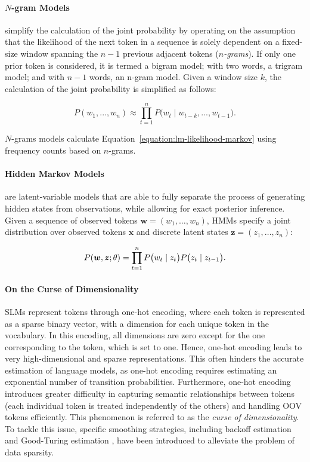 \paragraph{$N$-gram Models} simplify the calculation of the joint probability by operating on the assumption that the likelihood of the next token in a sequence is solely dependent on a fixed-size window spanning the $n-1$ previous adjacent tokens (\textit{$n$-grams}). If only one prior token is considered, it is termed a bigram model; with two words, a trigram model; and with $n-1$ words, an n-gram model. Given a window size $k$, the calculation of the joint probability is simplified as follows:

\begin{equation}
    P(w_1, ..., w_n) \approx \prod_{t=1}^{n} P\bigl(w_t \mid w_{t-k}, ..., w_{t-1}\bigr).
    \label{equation:lm-likelihood-markov}
\end{equation}

$N$-grams models calculate Equation~\ref{equation:lm-likelihood-markov} using frequency counts based on $n$-grams. 

\paragraph{Hidden Markov Models} are latent-variable models that are able to fully separate the process of generating hidden states from observations, while allowing for exact posterior inference. Given a sequence of observed tokens $\bm{w} = (w_1, \ldots, w_n)$, \acp{HMM} specify a joint distribution over observed tokens $\bm{x}$ and discrete latent states $\bm{z} = (z_1, \ldots, z_n)$:

\begin{equation}
    P(\bm{w}, \bm{z}; \theta) = \prod_{t=1}^{n} P\bigl(w_t \mid z_t \bigr) P\bigl(z_t \mid z_{t-1} \bigr). \\
\end{equation}


\paragraph{On the Curse of Dimensionality} \acp{SLM} represent tokens through one-hot encoding, where each token is represented as a sparse binary vector, with a dimension for each unique token in the vocabulary. In this encoding, all dimensions are zero except for the one corresponding to the token, which is set to one. Hence, one-hot encoding leads to very high-dimensional and sparse representations. This often hinders the accurate estimation of language models, as one-hot encoding requires estimating an exponential number of transition probabilities. Furthermore, one-hot encoding introduces greater difficulty in capturing semantic relationships between tokens (each individual token is treated independently of the others) and handling \ac{OOV} tokens efficiently. This phenomenon is referred to as the \textit{curse of dimensionality}. To tackle this issue, specific smoothing strategies, including backoff estimation \citep{katz1987estimation} and Good-Turing estimation \citep{gale1995good}, have been introduced to alleviate the problem of data sparsity. \\


